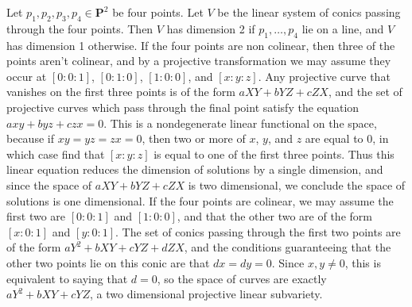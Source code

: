 \begin{example}
    Let $p_1,p_2,p_3,p_4 \in \mathbf{P}^2$ be four points. Let $V$ be the linear system of conics passing through the four points. Then $V$ has dimension 2 if $p_1, \dots, p_4$ lie on a line, and $V$ has dimension 1 otherwise. If the four points are non colinear, then three of the points aren't colinear, and by a projective transformation we may assume they occur at $[0:0:1]$, $[0:1:0]$, $[1:0:0]$, and $[x:y:z]$. Any projective curve that vanishes on the first three points is of the form $aXY + bYZ + cZX$, and the set of projective curves which pass through the final point satisfy the equation $axy + byz + czx = 0$. This is a nondegenerate linear functional on the space, because if $xy = yz = zx = 0$, then two or more of $x$, $y$, and $z$ are equal to 0, in which case find that $[x:y:z]$ is equal to one of the first three points. Thus this linear equation reduces the dimension of solutions by a single dimension, and since the space of $aXY + bYZ + cZX$ is two dimensional, we conclude the space of solutions is one dimensional. If the four points are colinear, we may assume the first two are $[0:0:1]$ and $[1:0:0]$, and that the other two are of the form $[x:0:1]$ and $[y:0:1]$. The set of conics passing through the first two points are of the form $aY^2 + bXY + cYZ + dZX$, and the conditions guaranteeing that the other two points lie on this conic are that $dx = dy = 0$. Since $x,y \neq 0$, this is equivalent to saying that $d = 0$, so the space of curves are exactly $aY^2 + bXY + cYZ$, a two dimensional projective linear subvariety.
\end{example}

